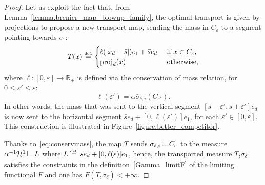 \documentclass[JEP,XML,SOM,Unicode,NoFloatCountersInSection,published]{cedram}
\theoremstyle{definition}
\newcommand{\eqdef}{\ensuremath{\stackrel{\mbox{\upshape\tiny def.}}{=}}}
\newcommand\LM[1]{\hbox{\vrule width.5pt \vbox to#1pt{\vfill \hrule width#1pt height.5pt}}}
\newcommand\LL{{\mathchoice {\>\LM7\>}{\>\LM7\>}{\,\LM5\,}{\,\LM{3.35}\,}}}
\newcommand{\mres}{\LL}
\newcommand\cH{\mathcal{H}}
\newcommand{\RR}{\mathbb{R}}
\DeclareMathOperator{\proj}{proj}
\begin{document}
\begin{proof}
Let us exploit the fact that, from Lemma~\ref{lemma.brenier_map_blowup_family}, the optimal transport is given by projections to propose a new transport map, sending the mass in $C_{\varepsilon}$ to a segment pointing towards $e_1$:
\[
T(x)
\eqdef
\begin{cases}
\ell(|x_d-\bar s|)e_1 + \bar s e_d& \text{ if $x \in C_{\varepsilon}$},\\
\proj_d(x)& \text{ otherwise,}
\end{cases}
\]
where $\ell:[0,\varepsilon] \to \RR_+$ is defined via the conservation of mass relation, for $0\le \varepsilon'\le \varepsilon$:
\begin{equation}\label{eq:conservmass}
\ell(\varepsilon') = \alpha \bar \sigma_{\delta, i}(C_{\varepsilon'}).
\end{equation}
In other words, the mass that was sent to the vertical segment $[\bar s-\varepsilon', \bar s+\varepsilon']e_d$ is now sent to the horizontal segment $\bar s e_d+[0, \ell(\varepsilon')]e_1$,
for each $\varepsilon'\in [0,\varepsilon]$.
This construction is illustrated in Figure~\ref{figure.better_competitor}.

Thanks to~\eqref{eq:conservmass}, the map $T$ sends $\bar \sigma_{\delta, i}\mres C_\varepsilon$ to
the measure $\alpha^{-1}\cH^1\mres L$
where $L\eqdef \bar s e_d+[0,\ell(\varepsilon)]e_1$,
hence, the transported measure $T_\sharp \bar \sigma_{\delta}$ satisfies the constraints in the definition~\eqref{Gamma_limitF} of the limiting functional $F$ and one has $F(T_\sharp \bar \sigma_{\delta})<+\infty$.


\end{proof}
\end{document}
